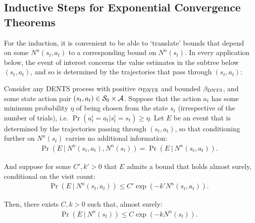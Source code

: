 \subsection{Inductive Steps for Exponential Convergence Theorems}
\label{appsec:exp-inductive}

    For the induction, it is convenient to be able to `translate' bounds that depend on some $N^n(s_t,a_t)$ to a corresponding bound on $N^n(s_t)$. In every application below, the event of interest concerns the value estimates in the subtree below $(s_t,a_t)$, and so is determined by the trajectories that pass through $(s_t,a_t)$:
    \begin{lemma} \label{lem:sa_to_s}
        Consider any DENTS process with positive ${\alpha_{{\textnormal{DNTS}}}}$ and bounded ${\beta_{{\textnormal{DNTS}}}}$, and some state action pair $(s_t,a_t)\in\mathcal{S}_0\times\mathcal{A}$. Suppose that the action $a_t$ has some minimum probability $\eta$ of being chosen from the state $s_t$ (irrespective of the number of trials), i.e. $\Pr(a^i_t=a_t|s^i_t=s_t)\geq\eta$. Let $E$ be an event that is determined by the trajectories passing through $(s_t,a_t)$, so that conditioning further on $N^n(s_t)$ carries no additional information:
        \begin{align}
            \Pr\left(E\ \big|\ N^n(s_t,a_t), N^n(s_t)\right) = \Pr\left(E\ \big|\ N^n(s_t,a_t)\right).
                \label{eq:sa_to_s_cond_indep}
        \end{align}

        And suppose for some $C',k'>0$ that $E$ admits a bound that holds almost surely, conditional on the visit count:
        \begin{align}
            \Pr\left(E\ \big|\ N^n(s_t,a_t)\right) \leq C'\exp(-k'N^n(s_t,a_t)). \label{eq:sa_to_s_assume_bound}
        \end{align}

        Then, there exists $C,k>0$ such that, almost surely:
        \begin{align}
            \Pr\left(E\ \big|\ N^n(s_t)\right) \leq C\exp(-k N^n(s_t)).
        \end{align}
    \end{lemma}
    
